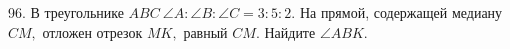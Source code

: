 96. В треугольнике $ABC\ \angle A: \angle B: \angle C=3:5:2.$ На прямой, содержащей медиану $CM,$ отложен отрезок $MK,$ равный $CM.$ Найдите $\angle ABK.$\\
